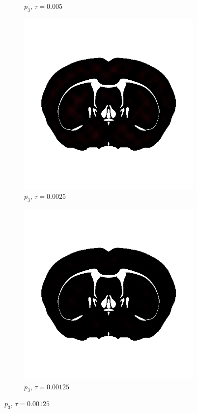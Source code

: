 \begin{figure}[h!]
\begin{subfigure}[b]{0.24\textwidth}
    \caption{$p_3$, $\tau=0.005$}
  \end{subfigure}
  \begin{subfigure}[b]{0.24\textwidth}
    \includegraphics[width=\textwidth,height=\textheight,keepaspectratio,height=\textheight,keepaspectratio]{figures/4_mpet/biomedical/time/eta4_p3_dt3.png}
    \caption{$p_3$, $\tau=0.0025$}
  \end{subfigure}
  \begin{subfigure}[b]{0.24\textwidth}
    \includegraphics[width=\textwidth,height=\textheight,keepaspectratio,height=\textheight,keepaspectratio]{figures/4_mpet/biomedical/time/eta4_p3_dt4.png}
    \caption{$p_3$, $\tau=0.00125$}
  \end{subfigure}


\end{figure}
